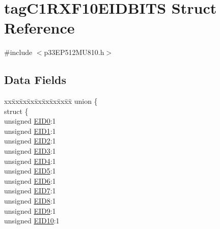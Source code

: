 \hypertarget{structtag_c1_r_x_f10_e_i_d_b_i_t_s}{}\section{tag\+C1\+R\+X\+F10\+E\+I\+D\+B\+I\+TS Struct Reference}
\label{structtag_c1_r_x_f10_e_i_d_b_i_t_s}


{\ttfamily \#include $<$p33\+E\+P512\+M\+U810.\+h$>$}

\subsection*{Data Fields}
\begin{DoxyCompactItemize}
\item 
\begin{tabbing}
xx\=xx\=xx\=xx\=xx\=xx\=xx\=xx\=xx\=\kill
union \{\\
\>struct \{\\
\>\>unsigned \hyperlink{structtag_c1_r_x_f10_e_i_d_b_i_t_s_a9da8b7b30247e4f9cd8cc056549aa9fd}{EID0}:1\\
\>\>unsigned \hyperlink{structtag_c1_r_x_f10_e_i_d_b_i_t_s_afd6c139491d147c1262f3d051c6691e9}{EID1}:1\\
\>\>unsigned \hyperlink{structtag_c1_r_x_f10_e_i_d_b_i_t_s_a36ec62d8d3c5acd5d15e6691dc099a94}{EID2}:1\\
\>\>unsigned \hyperlink{structtag_c1_r_x_f10_e_i_d_b_i_t_s_ab895f7d0ac289a0383b607cbc62eebe2}{EID3}:1\\
\>\>unsigned \hyperlink{structtag_c1_r_x_f10_e_i_d_b_i_t_s_a136d5a709d6618d40acceccb43036656}{EID4}:1\\
\>\>unsigned \hyperlink{structtag_c1_r_x_f10_e_i_d_b_i_t_s_a8dffb2d86a6c184df505ae7c71a58710}{EID5}:1\\
\>\>unsigned \hyperlink{structtag_c1_r_x_f10_e_i_d_b_i_t_s_af8a8574102515d8f1a4b7fd1685d0532}{EID6}:1\\
\>\>unsigned \hyperlink{structtag_c1_r_x_f10_e_i_d_b_i_t_s_a84c3262e67f8d5fd387ac10bde6fa9b1}{EID7}:1\\
\>\>unsigned \hyperlink{structtag_c1_r_x_f10_e_i_d_b_i_t_s_acca25e0b7d86eb499d01f85222baea87}{EID8}:1\\
\>\>unsigned \hyperlink{structtag_c1_r_x_f10_e_i_d_b_i_t_s_ac6748f73d4ada8538b06548be4f396c2}{EID9}:1\\
\>\>unsigned \hyperlink{structtag_c1_r_x_f10_e_i_d_b_i_t_s_a9cea8e77ecbb72bd3b08102412793725}{EID10}:1\\

\end{tabbing}
\end{DoxyCompactItemize}
